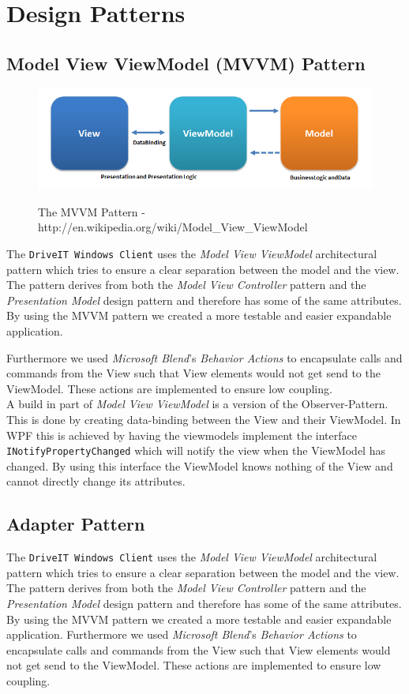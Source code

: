 \section{Design Patterns}
\subsection{Model View ViewModel (MVVM) Pattern}
\begin{figure}[H]
	\centering
	\includegraphics[scale=0.6]{Figures/WebImages/MVVMPattern}\\
	\caption{The MVVM Pattern - http://en.wikipedia.org/wiki/Model\_View\_ViewModel}
	\label{fig:MVVMPattern}
\end{figure}
The \texttt{DriveIT Windows Client} uses the \emph{Model View ViewModel} architectural pattern which tries to ensure a clear separation between the model and the view. The pattern derives from both the \emph{Model View Controller} pattern and the \emph{Presentation Model} design pattern and therefore has some of the same attributes. By using the MVVM pattern we created a more testable and easier expandable application.

Furthermore we used \emph{Microsoft Blend}'s \emph{Behavior Actions} to encapsulate calls and commands from the View such that View elements would not get send to the ViewModel. These actions are implemented to ensure low coupling.\\

A build in part of \textit{Model View ViewModel} is a version of the Observer-Pattern. This is done by creating data-binding between the View and their ViewModel. In WPF this is achieved by having the viewmodels implement the interface \texttt{INotifyPropertyChanged} which will notify the view when the ViewModel has changed. By using this interface the ViewModel knows nothing of the View and cannot directly change its attributes.

\subsection{Adapter Pattern}
The \texttt{DriveIT Windows Client} uses the \textit{Model View ViewModel} architectural pattern which tries to ensure a clear separation between the model and the view. The pattern derives from both the \textit{Model View Controller} pattern and the \textit{Presentation Model} design pattern and therefore has some of the same attributes. By using the MVVM pattern we created a more testable and easier expandable application. Furthermore we used \textit{Microsoft Blend}'s \textit{Behavior Actions} to encapsulate calls and commands from the View such that View elements would not get send to the ViewModel. These actions are implemented to ensure low coupling.\\


